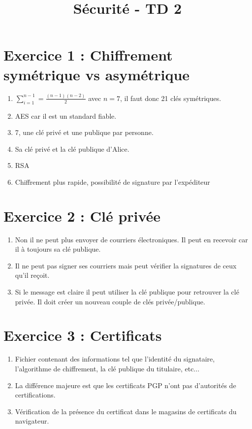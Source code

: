 \documentclass[11pt,a4paper]{article}
\title{Sécurité - TD 2}
\begin{document}
	
	\maketitle
	
	\section{Exercice 1 : Chiffrement symétrique vs asymétrique}
	
	\begin{enumerate}
		\item $\sum_{i=1}^{n-1} = \frac{(n-1)(n-2)}{2}$ avec $n = 7$, il faut donc 21 clés symétriques.
		\item AES car il est un standard fiable.
		\item 7, une clé privé et une publique par personne.
		\item Sa clé privé et la clé publique d'Alice.
		\item RSA
		\item Chiffrement plus rapide, possibilité de signature par l'expéditeur
	\end{enumerate}

	\section{Exercice 2 : Clé privée}
	
	\begin{enumerate}
		\item Non il ne peut plus envoyer de courriers électroniques. Il peut en recevoir car il à toujours sa clé publique.
		\item Il ne peut pas signer ses courriers mais peut vérifier la signatures de ceux qu'il reçoit.
		\item Si le message est claire il peut utiliser la clé publique pour retrouver la clé privée. Il doit créer un nouveau couple de clés privée/publique.
	\end{enumerate}

	\section{Exercice 3 : Certificats}
	
	\begin{enumerate}
		\item Fichier contenant des informations tel que l'identité du signataire, l'algorithme de chiffrement, la clé publique du titulaire, etc...
		\item La différence majeure est que les certificats PGP n'ont pas d'autorités de certifications.
		\item Vérification de la présence du certificat dans le magasins de certificats du navigateur.
	\end{enumerate}
\end{document}
